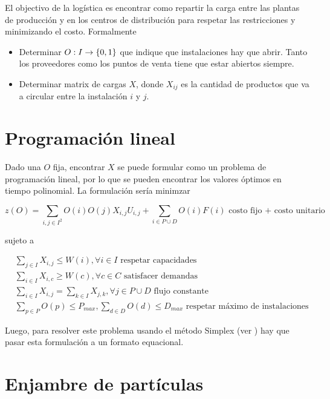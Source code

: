El objectivo de la logística es encontrar como repartir la carga entre las
plantas de producción y en los centros de distribución para respetar las
restricciones y minimizando el costo. Formalmente

\begin{itemize}
  \item Determinar $O: I \to \{ 0, 1 \}$ que indique que instalaciones
        hay que abrir. Tanto los proveedores como los puntos de venta tiene
        que estar abiertos siempre.
  \item Determinar matrix de cargas $X$, donde $X_{ij}$ es la cantidad de
        productos que va a circular entre la instalación $i$ y $j$.
\end{itemize}

\section{Programación lineal}

Dado una $O$ fija, encontrar $X$ se puede formular como un problema de
programación lineal, por lo que se pueden encontrar los valores óptimos
en tiempo polinomial. La formulación sería minimzar

\begin{equation}
  \label{eq:supply-cost}
  z(O) = \sum_{i, j \in I^{2}}{O(i)O(j)X_{i, j}U_{i, j}} +
  \sum_{i \in P \cup D}{O(i)F(i)}
  \text{ costo fijo + costo unitario }
\end{equation}

sujeto a

\begin{align*}
  \label{eq:supply-constraints}
  &\sum_{j \in I}{X_{i, j}} \leq W(i), \forall i \in I
    \text{ respetar capacidades }\\
  &\sum_{i \in I}{X_{i, c}} \geq W(c), \forall c \in C
    \text{ satisfacer demandas }\\
  &\sum_{i \in I}{X_{i, j}} = \sum_{k \in I}{X_{j, k}}, \forall j \in P \cup D
    \text{ flujo constante }\\
  &\sum_{p \in P}{O(p)} \leq P_{max}, \sum_{d \in D}{O(d)} \leq D_{max}
    \text{ respetar máximo de instalaciones}
\end{align*}

Luego, para resolver este problema usando el método Simplex (ver
\label{app:linprog}) hay que pasar esta formulación a un formato equacional.

\section{Enjambre de partículas}

